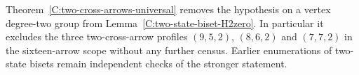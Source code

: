 \begin{remark}\label{C:two-cross-strengthens-earlier-gates}
Theorem~\ref{C:two-cross-arrows-universal} removes the hypothesis
on a vertex degree-two group from
Lemma~\ref{C:two-state-biset-H2zero}.  In particular it excludes
the three two-cross-arrow profiles $(9,5,2)$, $(8,6,2)$ and
$(7,7,2)$ in the sixteen-arrow scope without any further census.
Earlier enumerations of two-state bisets remain independent
checks of the stronger statement.
\end{remark}
